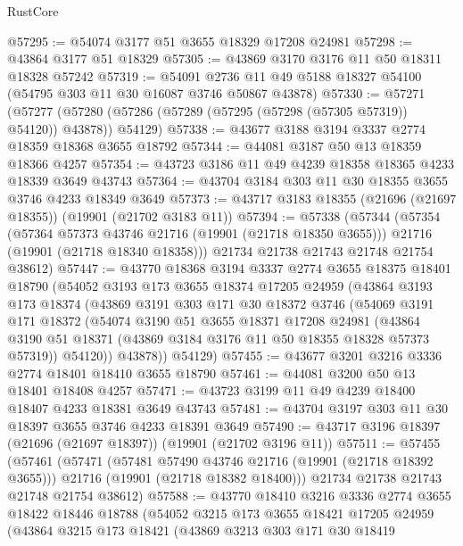 \begin{lexlean}{RustCore}
\begin{coremodule}
@57295 := @54074 @3177 @51 @3655 @18329 @17208 @24981
@57298 := @43864 @3177 @51 @18329
@57305 := @43869 @3170 @3176 @11 @50 @18311 @18328 @57242
@57319 := @54091 @2736 @11 @49 @5188 @18327 @54100 (@54795 @303 @11 @30 @16087 @3746 @50867 @43878)
@57330 := @57271
    (@57277 (@57280 (@57286 (@57289 (@57295 (@57298 (@57305 @57319)) @54120)) @43878)) @54129)
@57338 := @43677 @3188 @3194 @3337 @2774 @18359 @18368 @3655 @18792
@57344 := @44081 @3187 @50 @13 @18359 @18366 @4257
@57354 := @43723 @3186 @11 @49 @4239 @18358 @18365 @4233 @18339 @3649 @43743
@57364 := @43704 @3184 @303 @11 @30 @18355 @3655 @3746 @4233 @18349 @3649
@57373 := @43717 @3183 @18355 (@21696 (@21697 @18355)) (@19901 (@21702 @3183 @11))
@57394 := @57338
    (@57344
      (@57354
        (@57364 @57373 @43746 @21716 (@19901 (@21718 @18350 @3655)))
        @21716
        (@19901 (@21718 @18340 @18358)))
      @21734
      @21738
      @21743
      @21748
      @21754
      @38612)
@57447 := @43770
    @18368
    @3194
    @3337
    @2774
    @3655
    @18375
    @18401
    @18790
    (@54052
      @3193
      @173
      @3655
      @18374
      @17205
      @24959
      (@43864
        @3193
        @173
        @18374
        (@43869
          @3191
          @303
          @171
          @30
          @18372
          @3746
          (@54069
            @3191
            @171
            @18372
            (@54074
              @3190
              @51
              @3655
              @18371
              @17208
              @24981
              (@43864 @3190 @51 @18371 (@43869 @3184 @3176 @11 @50 @18355 @18328 @57373 @57319))
              @54120))
          @43878))
      @54129)
@57455 := @43677 @3201 @3216 @3336 @2774 @18401 @18410 @3655 @18790
@57461 := @44081 @3200 @50 @13 @18401 @18408 @4257
@57471 := @43723 @3199 @11 @49 @4239 @18400 @18407 @4233 @18381 @3649 @43743
@57481 := @43704 @3197 @303 @11 @30 @18397 @3655 @3746 @4233 @18391 @3649
@57490 := @43717 @3196 @18397 (@21696 (@21697 @18397)) (@19901 (@21702 @3196 @11))
@57511 := @57455
    (@57461
      (@57471
        (@57481 @57490 @43746 @21716 (@19901 (@21718 @18392 @3655)))
        @21716
        (@19901 (@21718 @18382 @18400)))
      @21734
      @21738
      @21743
      @21748
      @21754
      @38612)
@57588 := @43770
    @18410
    @3216
    @3336
    @2774
    @3655
    @18422
    @18446
    @18788
    (@54052
      @3215
      @173
      @3655
      @18421
      @17205
      @24959
      (@43864
        @3215
        @173
        @18421
        (@43869
          @3213
          @303
          @171
          @30
          @18419

\end{coremodule}
\end{lexlean}

